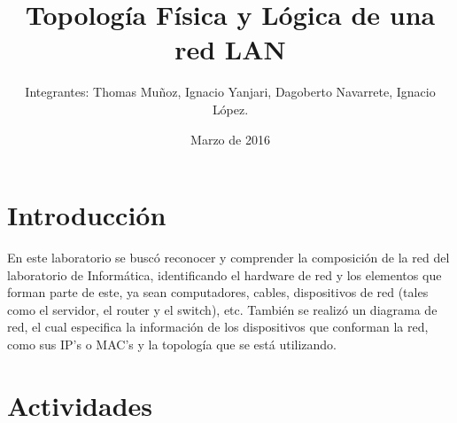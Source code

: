 \documentclass{udpreport}
\title{Topología Física y Lógica de una red LAN}
\author{Integrantes: Thomas Muñoz, Ignacio Yanjari, Dagoberto Navarrete, Ignacio López.}
\date{Marzo de 2016}
\begin{document}
\maketitle
\tableofcontents
\chapter{Introducción}
	        En este laboratorio se buscó reconocer y comprender la composición de la red del laboratorio de Informática, 
	        identificando el hardware de red y los elementos que forman parte de este, ya sean computadores, cables, dispositivos 
	        de red (tales como el servidor, el router y el switch), etc. También se realizó un diagrama de red, el cual especifica
	        la información de los dispositivos que conforman la red, como sus IP's o MAC's y la topología que se está utilizando.
\chapter{Actividades}
\end{document}
